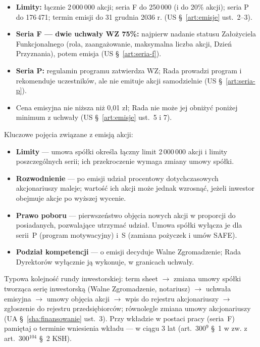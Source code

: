 \documentclass[11pt,a4paper]{report}
\begin{document}
\begin{itemize}
  \item \textbf{Limity:} łącznie 2\,000\,000 akcji; seria F do 250\,000 (i do 20\% akcji); seria P do 176\,471; termin emisji do 31 grudnia 2036 r. (US §~\ref{art:emisje} ust.~2--3).
  \item \textbf{Seria F --- dwie uchwały WZ 75\%:} najpierw nadanie statusu Założyciela Funkcjonalnego (rola, zaangażowanie, maksymalna liczba akcji, Dzień Przyznania), potem emisja (US §~\ref{art:seria-f}).
  \item \textbf{Seria P:} regulamin programu zatwierdza WZ; Rada prowadzi program i rekomenduje uczestników, ale nie emituje akcji samodzielnie (US §~\ref{art:seria-p}).
  \item Cena emisyjna nie niższa niż 0,01 zł; Rada nie może jej obniżyć poniżej minimum z uchwały (US §~\ref{art:emisje} ust.~5 i 7).
\end{itemize}

\begin{OCoChodzi}
Kluczowe pojęcia związane z emisją akcji:
\begin{itemize}
  \item \textbf{Limity} --- umowa spółki określa łączny limit 2\,000\,000 akcji i limity poszczególnych serii; ich przekroczenie wymaga zmiany umowy spółki.
  \item \textbf{Rozwodnienie} --- po emisji udział procentowy dotychczasowych akcjonariuszy maleje; wartość ich akcji może jednak wzrosnąć, jeżeli inwestor obejmuje akcje po wyższej wycenie.
  \item \textbf{Prawo poboru} --- pierwszeństwo objęcia nowych akcji w proporcji do posiadanych, pozwalające utrzymać udział. Umowa spółki wyłącza je dla serii~P (program motywacyjny) i~S (zamiana pożyczek i umów SAFE).
  \item \textbf{Podział kompetencji} --- o emisji decyduje Walne Zgromadzenie; Rada Dyrektorów wyłącznie ją wykonuje, w granicach uchwały.
\end{itemize}
\end{OCoChodzi}

\begin{Komentarz}
Typowa kolejność rundy inwestorskiej: term sheet $\to$ zmiana umowy spółki tworząca serię inwestorską (Walne Zgromadzenie, notariusz) $\to$ uchwała emisyjna $\to$ umowy objęcia akcji $\to$ wpis do rejestru akcjonariuszy $\to$ zgłoszenie do rejestru przedsiębiorców; równolegle zmiana umowy akcjonariuszy (UA §~\ref{sha:finansowanie} ust.~3). Przy wkładzie w postaci pracy (seria~F) pamiętaj o terminie wniesienia wkładu --- w ciągu 3 lat (art.~300$^{9}$ §~1 w zw. z art.~300$^{104}$ §~2 KSH).
\end{Komentarz}
\end{document}
